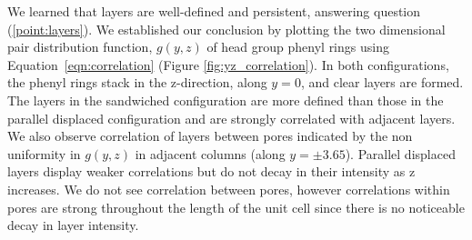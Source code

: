 \documentclass[journal=jpcbfk,manusciprt=article]{achemso}
\begin{document}
  We learned that layers are well-defined and persistent, answering question
  (\ref{point:layers}). We established our conclusion by plotting the two
  dimensional pair distribution function, $g(y,z)$ of head group phenyl rings
  using Equation~\ref{eqn:correlation} (Figure \ref{fig:yz_correlation}). In both
  configurations, the phenyl rings stack in the z-direction, along $y=0$, and
  clear layers are formed. The layers in the sandwiched configuration are more
  defined than those in the parallel displaced configuration and are strongly
  correlated with adjacent layers. We also observe correlation of layers between
  pores indicated by the non uniformity in $g(y,z)$ in adjacent columns (along $y
  = \pm 3.65$). Parallel displaced layers display weaker correlations but do not
  decay in their intensity as z increases. We do not see correlation between
  pores, however correlations within pores are strong throughout the length of
  the unit cell since there is no noticeable decay in layer intensity. 
\end{document}
